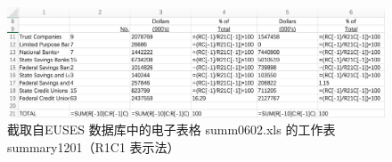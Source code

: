 \begin{figure}[tbp]    
    \centering
    \includegraphics[width=\textwidth]{figure/style-R1C1.png}
    \caption{截取自EUSES 数据库中的电子表格 summ0602.xls 的工作表summary1201（R1C1 表示法）}
    \label{figure-R1C1}
\end{figure}